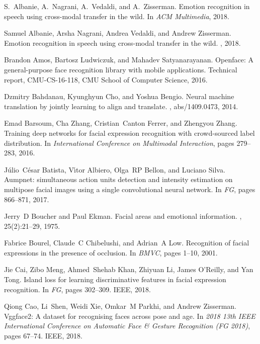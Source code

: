 \documentclass[journal]{IEEEtran}
\begin{document}

\begin{thebibliography}{10}
S.~Albanie, A.~Nagrani, A.~Vedaldi, and A.~Zisserman.
\newblock Emotion recognition in speech using cross-modal transfer in the wild.
\newblock In {\em ACM Multimedia}, 2018.

Samuel Albanie, Arsha Nagrani, Andrea Vedaldi, and Andrew Zisserman.
\newblock Emotion recognition in speech using cross-modal transfer in the wild.
, 2018.

Brandon Amos, Bartosz Ludwiczuk, and Mahadev Satyanarayanan.
\newblock Openface: A general-purpose face recognition library with mobile
applications.
\newblock Technical report, CMU-CS-16-118, CMU School of Computer Science,
2016.

Dzmitry Bahdanau, Kyunghyun Cho, and Yoshua Bengio.
\newblock Neural machine translation by jointly learning to align and
translate.
, abs/1409.0473, 2014.

Emad Barsoum, Cha Zhang, Cristian~Canton Ferrer, and Zhengyou Zhang.
\newblock Training deep networks for facial expression recognition with
crowd-sourced label distribution.
\newblock In {\em International Conference on Multimodal Interaction}, pages
279--283, 2016.

J{\'u}lio~C{\'e}sar Batista, V{\'\i}tor Albiero, Olga~RP Bellon, and Luciano
Silva.
\newblock Aumpnet: simultaneous action units detection and intensity estimation
on multipose facial images using a single convolutional neural network.
\newblock In {\em FG}, pages 866--871, 2017.

Jerry~D Boucher and Paul Ekman.
\newblock Facial areas and emotional information.
, 25(2):21--29, 1975.

Fabrice Bourel, Claude~C Chibelushi, and Adrian~A Low.
\newblock Recognition of facial expressions in the presence of occlusion.
\newblock In {\em BMVC}, pages 1--10, 2001.

Jie Cai, Zibo Meng, Ahmed~Shehab Khan, Zhiyuan Li, James O’Reilly, and Yan
Tong.
\newblock Island loss for learning discriminative features in facial expression
recognition.
\newblock In {\em FG}, pages 302--309. IEEE, 2018.

Qiong Cao, Li~Shen, Weidi Xie, Omkar~M Parkhi, and Andrew Zisserman.
\newblock Vggface2: A dataset for recognising faces across pose and age.
\newblock In {\em 2018 13th IEEE International Conference on Automatic Face \&
	Gesture Recognition (FG 2018)}, pages 67--74. IEEE, 2018.


\end{thebibliography}
\end{document}
